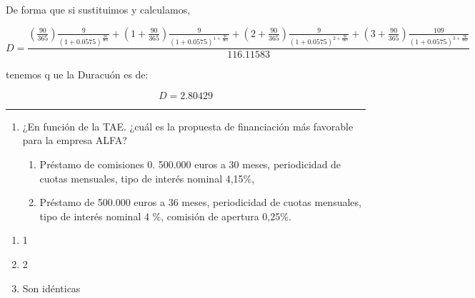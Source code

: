 \documentclass[
  letterpaper,
  DIV=11,
  numbers=noendperiod]{scrreprt}
\begin{document}
\begin{tcolorbox}
\begin{tcolorbox}
De forma que si sustituimos y calculamos,

\[D=\frac{\left(\frac{90}{365}\right)\frac{9}{\left(1+0.0575\right)^{\frac{90}{365}}}+\left(1+\frac{90}{365}\right)\frac{9}{\left(1+0.0575\right)^{1+\frac{90}{365}}}+\left(2+\frac{90}{365}\right)\frac{9}{\left(1+0.0575\right)^{2+\frac{90}{365}}}+\left(3+\frac{90}{365}\right)\frac{109}{\left(1+0.0575\right)^{3+\frac{90}{365}}}}{116.11583}\]

tenemos q ue la Duracuón es de:

\[D=2.80429\]

\end{tcolorbox}

\begin{center}\rule{0.5\linewidth}{0.5pt}\end{center}

\begin{enumerate}
\def\labelenumi{\arabic{enumi}.}
\setcounter{enumi}{2}
\item
  ¿En función de la TAE. ¿cuál es la propuesta de financiación más
  favorable para la empresa ALFA?

  \begin{enumerate}
  \def\labelenumii{\arabic{enumii}.}
  \item
    Préstamo de comisiones 0. 500.000 euros a 30 meses, periodicidad de
    cuotas mensuales, tipo de interés nominal 4,15\%,
  \item
    Préstamo de 500.000 euros a 36 meses, periodicidad de cuotas
    mensuales, tipo de interés nominal 4 \%, comisión de apertura
    0,25\%.
  \end{enumerate}
\end{enumerate}

\begin{enumerate}
\def\labelenumi{\alph{enumi}.}
\item
  1
\item
  2
\item
  Son idénticas
\end{enumerate}

\begin{tcolorbox}[enhanced jigsaw, toprule=.15mm, left=2mm, breakable, opacitybacktitle=0.6, toptitle=1mm, coltitle=black, arc=.35mm, leftrule=.75mm, bottomtitle=1mm, titlerule=0mm, title=\textcolor{quarto-callout-tip-color}{\faLightbulb}\hspace{0.5em}{Solución}, rightrule=.15mm, opacityback=0, bottomrule=.15mm, colback=white, colframe=quarto-callout-tip-color-frame, colbacktitle=quarto-callout-tip-color!10!white]


\end{tcolorbox}
\end{tcolorbox}
\end{document}
